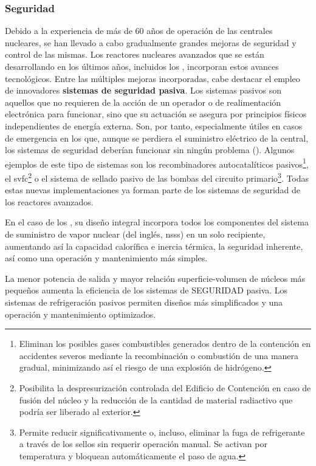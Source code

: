 \subsubsection{Seguridad}

Debido a la experiencia de más de 60 años de operación de las centrales nucleares, se han llevado a cabo gradualmente grandes mejoras de seguridad y control de las mismas. Los reactores nucleares avanzados que se están desarrollando en los últimos años, incluidos los , incorporan estos avances tecnológicos. Entre las múltiples mejoras incorporadas, cabe destacar el empleo de innovadores \textbf{sistemas de seguridad pasiva}. Los sistemas pasivos son aquellos que no requieren de la acción de un operador o de realimentación electrónica para funcionar, sino que su actuación se asegura por principios físicos independientes de energía externa. Son, por tanto, especialmente útiles en casos de emergencia en los que, aunque se perdiera el suministro eléctrico de la central, los sistemas de seguridad deberían funcionar sin ningún problema (\cite{glosario_seguridad_oiea}). Algunos ejemplos de este tipo de sistemas son los recombinadores autocatalíticos pasivos\footnote{Eliminan los posibles gases combustibles generados dentro de la contención en accidentes severos mediante la recombinación o combustión de una manera gradual, minimizando así el riesgo de una explosión de hidrógeno.}, el \acrfull{svfc}\footnote{Posibilita la despresurización controlada del Edificio de Contención en caso de fusión del núcleo y la reducción de la cantidad de material radiactivo que podría ser liberado al exterior.} o el sistema de sellado pasivo de las bombas del circuito primario\footnote{Permite reducir significativamente o, incluso, eliminar la fuga de refrigerante a través de los sellos sin requerir operación manual. Se activan por temperatura y bloquean automáticamente
el paso de agua.}. Todas estas nuevas implementaciones ya forman parte de los sistemas de seguridad de los reactores avanzados.

En el caso de los , su diseño integral incorpora todos los componentes del sistema de suministro de vapor nuclear (del inglés, \acrshort{nsss}) en un solo recipiente, aumentando así la capacidad calorífica e inercia térmica, la seguridad inherente, así como una operación y mantenimiento más simples.

La menor potencia de salida y mayor relación superficie-volumen de núcleos más pequeños aumenta la eficiencia de los sistemas de SEGURIDAD pasiva. Los sistemas de refrigeración pasivos permiten diseños más simplificados y una operación y mantenimiento optimizados.

